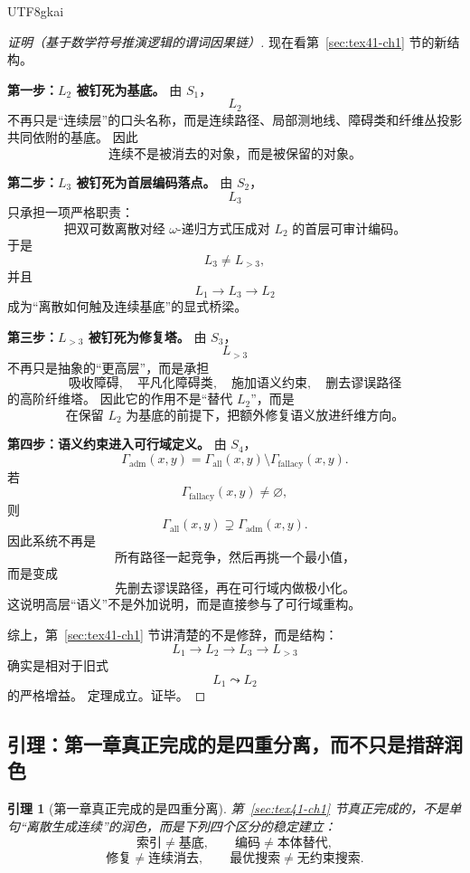 \documentclass[12pt]{article}
\newtheorem{lemma}{引理}[section]
\begin{document}
\begin{CJK*}{UTF8}{gkai}
\begin{proof}[证明（基于数学符号推演逻辑的谓词因果链）]
现在看第~\ref{sec:tex41-ch1} 节的新结构。

\textbf{第一步：$L_2$ 被钉死为基底。}
由 $S_1$，
\[
  L_2
\]
不再只是“连续层”的口头名称，而是连续路径、局部测地线、障碍类和纤维丛投影共同依附的基底。
因此
\[
  \text{连续不是被消去的对象，而是被保留的对象。}
\]

\textbf{第二步：$L_3$ 被钉死为首层编码落点。}
由 $S_2$，
\[
  L_3
\]
只承担一项严格职责：
\[
  \text{把双可数离散对经 $\omega$-递归方式压成对 $L_2$ 的首层可审计编码。}
\]
于是
\[
  L_3\neq L_{>3},
\]
并且
\[
  L_1\to L_3\to L_2
\]
成为“离散如何触及连续基底”的显式桥梁。

\textbf{第三步：$L_{>3}$ 被钉死为修复塔。}
由 $S_3$，
\[
  L_{>3}
\]
不再只是抽象的“更高层”，而是承担
\[
  \text{吸收障碍},\quad
  \text{平凡化障碍类},\quad
  \text{施加语义约束},\quad
  \text{删去谬误路径}
\]
的高阶纤维塔。
因此它的作用不是“替代 $L_2$”，而是
\[
  \text{在保留 $L_2$ 为基底的前提下，把额外修复语义放进纤维方向。}
\]

\textbf{第四步：语义约束进入可行域定义。}
由 $S_4$，
\[
  \Gamma_{\mathrm{adm}}(x,y)
  =
  \Gamma_{\mathrm{all}}(x,y)\setminus \Gamma_{\mathrm{fallacy}}(x,y).
\]
若
\[
  \Gamma_{\mathrm{fallacy}}(x,y)\neq\varnothing,
\]
则
\[
  \Gamma_{\mathrm{all}}(x,y)\supsetneq \Gamma_{\mathrm{adm}}(x,y).
\]
因此系统不再是
\[
  \text{所有路径一起竞争，然后再挑一个最小值，}
\]
而是变成
\[
  \text{先删去谬误路径，再在可行域内做极小化。}
\]
这说明高层“语义”不是外加说明，而是直接参与了可行域重构。

综上，第~\ref{sec:tex41-ch1} 节讲清楚的不是修辞，而是结构：
\[
  L_1\to L_2\to L_3\to L_{>3}
\]
确实是相对于旧式
\[
  L_1\leadsto L_2
\]
的严格增益。
定理成立。证毕。
\end{proof}

\subsection{引理：第一章真正完成的是四重分离，而不只是措辞润色}
\label{subsec:tex41-upgrade-lemma}

\begin{lemma}[第一章真正完成的是四重分离]
\label{lem:tex41-upgrade-separation}
第~\ref{sec:tex41-ch1} 节真正完成的，不是单句“离散生成连续”的润色，而是下列四个区分的稳定建立：
\[
  \text{索引}\neq\text{基底},
  \qquad
  \text{编码}\neq\text{本体替代},
\]
\[
  \text{修复}\neq\text{连续消去},
  \qquad
  \text{最优搜索}\neq\text{无约束搜索}.
\]
\end{lemma}


\end{CJK*}
\end{document}
